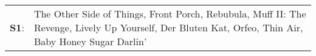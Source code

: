 \begin{supertabular}{p{0.03\textwidth}p{0.92\textwidth}}
 \textbf{S1}:  &  The Other Side of Things\textsuperscript{}, \enspace Front Porch\textsuperscript{}, \enspace Rebubula\textsuperscript{}, \enspace Muff II: The Revenge\textsuperscript{}, \enspace Lively Up Yourself\textsuperscript{}, \enspace Der Bluten Kat\textsuperscript{}, \enspace Orfeo\textsuperscript{}, \enspace Thin Air\textsuperscript{}, \enspace Baby Honey Sugar Darlin'\textsuperscript{}  \enspace  \\
\end{supertabular}
